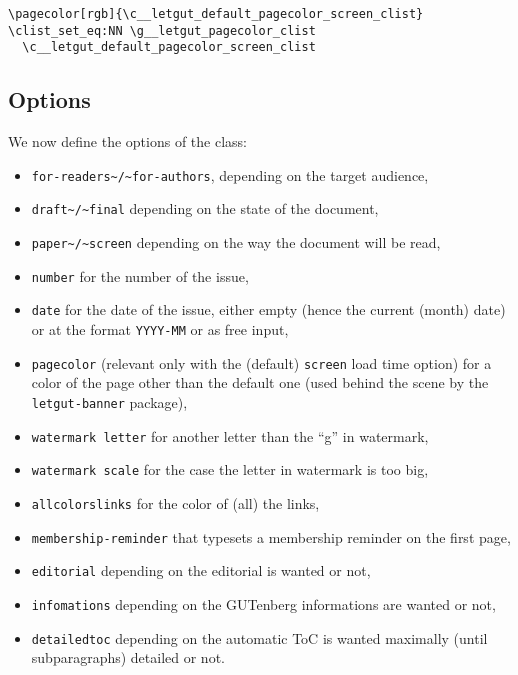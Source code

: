 \documentclass{letgut}
\begin{document}
\begin{lstlisting}
\pagecolor[rgb]{\c__letgut_default_pagecolor_screen_clist}
\clist_set_eq:NN \g__letgut_pagecolor_clist
  \c__letgut_default_pagecolor_screen_clist
\end{lstlisting}

\subsection{Options}
\label{ImplementationOptions-imhg55h0jlj0}
We now define the options of the class:

\begin{itemize}
\item \lstinline+for-readers~/~for-authors+, depending on the target audience,
\item \lstinline+draft~/~final+ depending on the state of the document,
\item \lstinline+paper~/~screen+ depending on the way the document will be read,
\item \lstinline+number+ for the number of the issue,
\item \lstinline+date+ for the date of the issue, either empty (hence the current (month)
date) or at the format \lstinline+YYYY-MM+ or as free input,
\item \lstinline+pagecolor+ (relevant only with the (default) \lstinline+screen+ load time option) for
a color of the page other than the default one (used behind the scene by the
\lstinline+letgut-banner+ package),
\item \lstinline+watermark letter+ for another letter than the “g” in watermark,
\item \lstinline+watermark scale+ for the case the letter in watermark is too big,
\item \lstinline+allcolorslinks+ for the color of (all) the links,
\item \lstinline+membership-reminder+ that typesets a membership reminder on the first page,
\item \lstinline+editorial+ depending on the editorial is wanted or not,
\item \lstinline+infomations+ depending on the GUTenberg informations are wanted or not,
\item \lstinline+detailedtoc+ depending on the automatic ToC is wanted maximally (until
subparagraphs) detailed or not.
\end{itemize}
\end{document}

